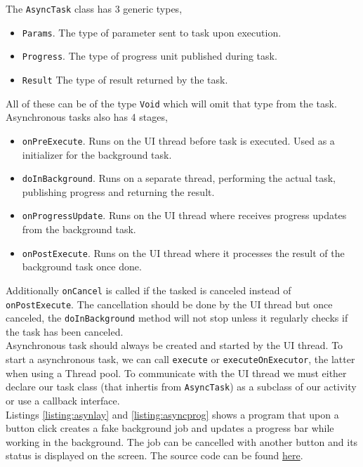 The \texttt{AsyncTask} class has 3 generic types,
\begin{itemize}
\item \texttt{Params}. The type of parameter sent to task upon execution.
\item \texttt{Progress}. The type of progress unit published during task.
\item \texttt{Result} The type of result returned by the task.
\end{itemize}
All of these can be of the type \texttt{Void} which will omit that type from the task. Asynchronous tasks also has 4 stages,
\begin{itemize}
\item \texttt{onPreExecute}. Runs on the UI thread before task is executed. Used as a initializer for the background task.
\item \texttt{doInBackground}. Runs on a separate thread, performing the actual task, publishing progress and returning the result.
\item \texttt{onProgressUpdate}. Runs on the UI thread where receives progress updates from the background task.
\item \texttt{onPostExecute}. Runs on the UI thread where it processes the result of the background task once done.
\end{itemize}
Additionally \texttt{onCancel} is called if the tasked is canceled instead of \texttt{onPostExecute}. The cancellation should be done by the UI thread but once canceled, the \texttt{doInBackground} method will not stop unless it regularly checks if the task has been canceled.\\

Asynchronous task should always be created and started by the UI thread. To start a asynchronous task, we can call \texttt{execute} or \texttt{executeOnExecutor}, the latter when using a Thread pool. To communicate with the UI thread we must either declare our task class (that inhertis from \texttt{AsyncTask}) as a subclass of our activity or use a callback interface.\\

Listings \ref{listing:asynlay} and \ref{listing:asyncprog} shows a program that upon a button click creates a fake background job and updates a progress bar while working in the background. The job can be cancelled with another button and its status is displayed on the screen. The source code can be found \href{https://github.com/JonSteinn/AndroidDevelopment/tree/master/examples/lab2/asynctask}{here}.

